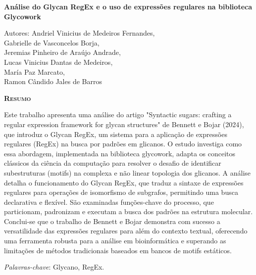 \begin{center}
	{\Large{\textbf{Análise do Glycan RegEx e o uso de expressões regulares na biblioteca Glycowork}}}
\end{center}

\vspace{1cm}

\begin{flushright}
	Autores: Andriel Vinicius de Medeiros Fernandes, \\
	Gabrielle de Vasconcelos Borja, \\
	Jeremias Pinheiro de Araújo Andrade, \\
	Lucas Vinicius Dantas de Medeiros, \\
	María Paz Marcato, \\
	Ramon Cândido Jales de Barros \\
\end{flushright}

\vspace{1cm}

\begin{center}
	\Large{\textsc{\textbf{Resumo}}}
\end{center}

\noindent Este trabalho apresenta uma análise do artigo "Syntactic sugars: 
crafting a regular expression framework for glycan structures" de Bennett e 
Bojar (2024), que introduz o Glycan RegEx, um sistema para a aplicação de 
expressões regulares (RegEx) na busca por padrões em glicanos. O estudo investiga 
como essa abordagem, implementada na biblioteca glycowork, adapta os conceitos 
clássicos da ciência da computação para resolver o desafio de identificar subestruturas 
(motifs) na complexa e não linear topologia dos glicanos. A análise detalha o 
funcionamento do Glycan RegEx, que traduz a sintaxe de expressões regulares para 
operações de isomorfismo de subgrafos, permitindo uma busca declarativa e flexível. 
São examinadas funções-chave do processo, que particionam, padronizam e executam a 
busca dos padrões na estrutura molecular. Conclui-se que o trabalho de Bennett e 
Bojar demonstra com sucesso a versatilidade das expressões regulares para além do 
contexto textual, oferecendo uma ferramenta robusta para a análise em bioinformática 
e superando as limitações de métodos tradicionais baseados em bancos de motifs estáticos.

\noindent\textit{Palavras-chave}: Glycano, RegEx.